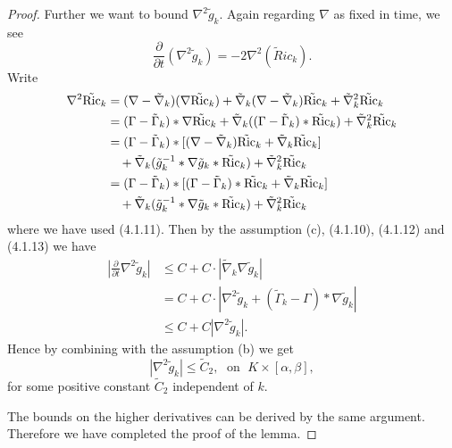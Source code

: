 \begin{proof}
Further we want to bound $\nabla^2\tilde{g}_k$. Again regarding
$\nabla$ as fixed in time, we see
$$
\frac{\partial}{\partial
t}(\nabla^2\tilde{g}_k)=-2\nabla^2(\tilde{R}ic_k).
$$
Write
\begin{align*}
\nabla^2\tilde{\operatorname{Ric}}_k& =
(\nabla-\tilde{\nabla}_k)(\nabla\tilde{\operatorname{Ric}}_k)+
\tilde{\nabla}_k(\nabla-\tilde{\nabla}_k)\tilde{\operatorname{Ric}}_k
+\tilde{\nabla}^2_k\tilde{\operatorname{Ric}}_k\\
&  = (\Gamma-\tilde{\Gamma}_k)*\nabla\tilde{\operatorname{Ric}}_k+
\tilde{\nabla}_k((\Gamma-\tilde{\Gamma}_k)*\tilde{\operatorname{Ric}}_k)
+\tilde{\nabla}^2_k\tilde{\operatorname{Ric}}_k\\
&
=(\Gamma-\tilde{\Gamma}_k)*[(\nabla-\tilde{\nabla}_k)\tilde{\operatorname{Ric}}_k
+\tilde{\nabla}_k\tilde{\operatorname{Ric}}_k] \\
&\quad+
\tilde{\nabla}_k(\tilde{g}_k^{-1}*\nabla\tilde{g}_k*\tilde{\operatorname{Ric}}_k)
+\tilde{\nabla}^2_k\tilde{\operatorname{Ric}}_k\\
&
=(\Gamma-\tilde{\Gamma}_k)*[(\Gamma-\tilde{\Gamma}_k)*\tilde{\operatorname{Ric}}_k
+\tilde{\nabla}_k\tilde{\operatorname{Ric}}_k] \\
&\quad+
\tilde{\nabla}_k(\tilde{g}_k^{-1}*\nabla\tilde{g}_k*\tilde{\operatorname{Ric}}_k)
+\tilde{\nabla}^2_k\tilde{\operatorname{Ric}}_k
\end{align*}
where we have used (4.1.11). Then by the assumption (c), (4.1.10),
(4.1.12) and (4.1.13) we have
\begin{align*}
|\frac{\partial}{\partial t}\nabla^2\tilde{g}_k|
&  \leq  C+C\cdot|\tilde{\nabla}_k\nabla\tilde{g}_k|\\
&  = C+C\cdot|\nabla^2\tilde{g}_k
+(\tilde{\Gamma}_k-\Gamma)*\nabla\tilde{g}_k|\\
&  \leq C+C|\nabla^2\tilde{g}_k|.
\end{align*}
Hence by combining with the assumption (b) we get
$$
|\nabla^2\tilde{g}_k|\leq\tilde{C}_2,\; \mbox{ on }\;
K\times[\alpha,\beta],
$$
for some positive constant $\tilde{C}_2$ independent of $k$.

The bounds on the higher derivatives can be derived by the same
argument. Therefore we have completed the proof of the lemma.
\end{proof}

